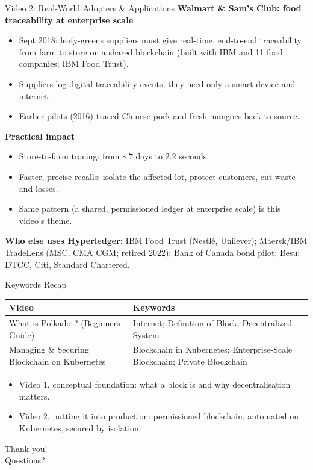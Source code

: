 \documentclass[aspectratio=169,11pt]{beamer}
\begin{document}
\begin{frame}{Video 2: Real-World Adopters \& Applications}
  \footnotesize
  \textbf{Walmart \& Sam's Club: food traceability at enterprise scale}
  \begin{itemize}
    \item Sept 2018: leafy-greens suppliers must give real-time, end-to-end traceability from farm to store on a shared blockchain (built with IBM and 11 food companies; IBM Food Trust).
    \item Suppliers log digital traceability events; they need only a smart device and internet.
    \item Earlier pilots (2016) traced Chinese pork and fresh mangoes back to source.
  \end{itemize}
  \textbf{Practical impact}
  \begin{itemize}
    \item Store-to-farm tracing: from \alert{$\sim$7 days} to \alert{2.2 seconds}.
    \item Faster, precise recalls: isolate the affected lot, protect customers, cut waste and losses.
    \item Same pattern (a shared, permissioned ledger at enterprise scale) is this video's theme.
  \end{itemize}
  \textbf{Who else uses Hyperledger:} IBM Food Trust (Nestl\'e, Unilever); Maersk/IBM
  TradeLens (MSC, CMA CGM; retired 2022); Bank of Canada bond pilot; Besu: DTCC, Citi,
  Standard Chartered.
\end{frame}

\begin{frame}{Keywords Recap}
  \small
  \begin{tabular}{@{}p{}p{}@{}}
    \toprule
    \textbf{Video} & \textbf{Keywords} \\
    \midrule
    What is Polkadot? (Beginners Guide) & Internet; Definition of Block; Decentralized System \\
    \addlinespace
    Managing \& Securing Blockchain on Kubernetes & Blockchain in Kubernetes; Enterprise-Scale Blockchain; Private Blockchain \\
    \bottomrule
  \end{tabular}
  \vfill
  \begin{itemize}
    \item Video 1, conceptual foundation: what a block is and why decentralisation matters.
    \item Video 2, putting it into production: permissioned blockchain, automated on Kubernetes, secured by isolation.
  \end{itemize}
\end{frame}

\begin{frame}[standout]
  Thank you! \\[0.5em]
  \small Questions?
\end{frame}
\end{document}

